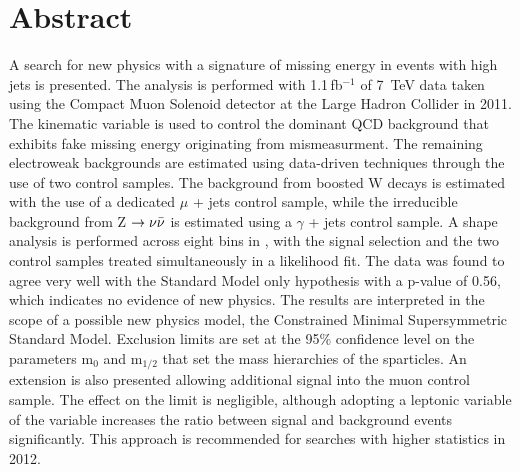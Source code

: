 \chapter*{Abstract}
\noindent 
\vspace{0mm}
\normalsize

A search for new physics with a signature of missing energy in events with high \Pt jets is presented. The analysis is performed with 1.1\,fb$^{-1}$ of 7~TeV data taken using the Compact Muon Solenoid detector at the Large Hadron Collider in 2011. The kinematic variable \alt is used to control the dominant QCD background that exhibits fake missing energy originating from mismeasurment. The remaining electroweak backgrounds are estimated using data-driven techniques through the use of two control samples. The background from boosted W decays is estimated with the use of a dedicated $\mu$ + jets control sample, while the irreducible background from Z $\rightarrow \nu \bar{\nu}$ is estimated using a $\gamma$ + jets control sample.  A shape analysis is performed across eight bins in \HT, with the signal selection and the two control samples treated simultaneously in a likelihood fit.  The data was found to agree very well with the Standard Model only hypothesis with a p-value of 0.56, which indicates no evidence of new physics. The results are interpreted in the scope of a possible new physics model, the Constrained Minimal Supersymmetric Standard Model. Exclusion limits are set at the 95\% confidence level on the parameters m$_{0}$ and m$_{1/2}$ that set the mass hierarchies of the sparticles. An extension is also presented allowing additional signal into the muon control sample. The effect on the limit is negligible, although adopting a leptonic variable of the \alt variable increases the ratio between signal and background events significantly. This approach is recommended for searches with higher statistics in 2012. 



